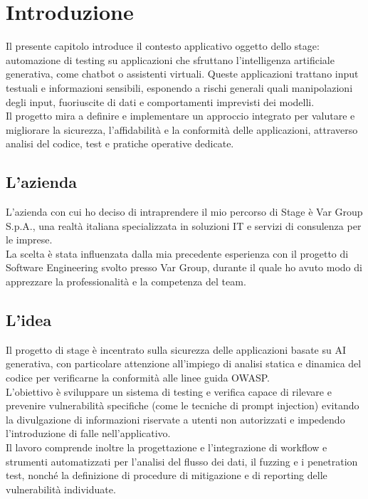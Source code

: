 \chapter{Introduzione}
\label{cap:introduzione}

Il presente capitolo introduce il contesto applicativo oggetto dello stage: automazione di testing su applicazioni che sfruttano l'intelligenza artificiale generativa, come chatbot o assistenti virtuali. Queste applicazioni trattano input testuali e informazioni sensibili, esponendo a rischi generali quali manipolazioni degli input, fuoriuscite di dati e comportamenti imprevisti dei modelli.\\
Il progetto mira a definire e implementare un approccio integrato per valutare e migliorare la sicurezza, l'affidabilità e la conformità delle applicazioni, attraverso analisi del codice, test e pratiche operative dedicate.\\



\section{L'azienda}
L'azienda con cui ho deciso di intraprendere il mio percorso di Stage è Var Group S.p.A., 
una realtà italiana specializzata in soluzioni IT e servizi di consulenza per le imprese.\\
La scelta è stata influenzata dalla mia precedente esperienza con il progetto di Software Engineering svolto presso Var Group,
durante il quale ho avuto modo di apprezzare la professionalità e la competenza del team.

\section{L'idea}
Il progetto di stage è incentrato sulla sicurezza delle applicazioni basate su AI generativa, con particolare attenzione all'impiego di analisi statica e dinamica del codice per verificarne la conformità alle linee guida OWASP. \\
L'obiettivo è sviluppare un sistema di testing e verifica capace di rilevare e prevenire vulnerabilità specifiche (come le tecniche di prompt injection) evitando la divulgazione di informazioni riservate a utenti non autorizzati e impedendo l'introduzione di falle nell'applicativo.\\
Il lavoro comprende inoltre la progettazione e l'integrazione di workflow e strumenti automatizzati per l'analisi del flusso dei dati, il fuzzing e i penetration test, nonché la definizione di procedure di mitigazione e di reporting delle vulnerabilità individuate.

